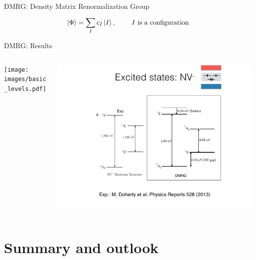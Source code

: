 \documentclass[notes=hide]{beamer}
\newcommand{\ket}[1]{\left| #1 \right>} %
\begin{document}
\begin{frame}{DMRG: Density Matrix Renormalization Group}
  \centering
  \[
  \ket{\Phi} = \sum^{}_{I} c_{I} \ket{I}, \qquad \mbox{ $ I $ is a configuration}
  \]
\end{frame}

\begin{frame}{DMRG: Results}
  \begin{columns}
    \begin{column}{0.5\textwidth}
      \texttt{[image: images/basic\_levels.pdf]}
    \end{column}
    \begin{column}{0.5\textwidth}
      \includegraphics[width=1\textwidth, trim=500 200 190 200, clip]{images/dmrg_results.pdf}
    \end{column}
  \end{columns}
\end{frame}



\section{Summary and outlook} %
\end{document}
